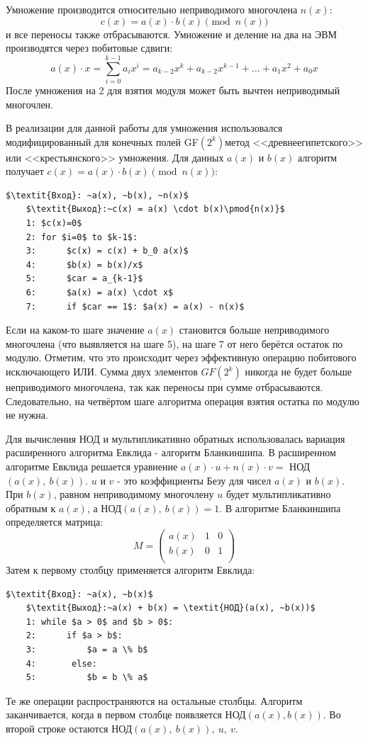 \documentclass[times,specification,annotation]{itmo-student-thesis}
\begin{document}
Умножение производится относительно неприводимого многочлена $n(x)$:
\[c(x) = a(x) \cdot b(x)\pmod{n(x)}\]
и все переносы также отбрасываются.
Умножение и деление на два  на ЭВМ производятся через побитовые сдвиги:
\[a(x) \cdot x = \sum_{i=0}^{k-1}a_i x^i = a_{k-2}x^{k} + a_{k-2}x^{k-1} + \dots + a_1 x^2 + a_0 x\]
После умножения на 2 для взятия модуля может быть вычтен неприводимый многочлен.

В реализации для данной работы для умножения использовался модифицированный для конечных полей GF$(2^k)$метод
<<древнеегипетского>> или <<крестьянского>> умножения.
Для данных $a(x)$ и $b(x)$ алгоритм получает $c(x) = a(x) \cdot b(x) \pmod{n(x)}$:
\begin{lstlisting}[mathescape=true]
    $\textit{Вход}: ~a(x), ~b(x), ~n(x)$
    $\textit{Выход}:~c(x) = a(x) \cdot b(x)\pmod{n(x)}$
    1: $c(x)=0$
    2: for $i=0$ to $k-1$:
    3:      $c(x) = c(x) + b_0 a(x)$
    4:      $b(x) = b(x)/x$
    5:      $car = a_{k-1}$
    6:      $a(x) = a(x) \cdot x$
    7:      if $car == 1$: $a(x) = a(x) - n(x)$
\end{lstlisting}
Если на каком-то шаге значение $a(x)$ становится больше неприводимого многочлена (что выявляется на шаге 5), на шаге 7
от него берётся остаток по модулю.
Отметим, что это происходит через эффективную операцию побитового исключающего ИЛИ.
Сумма двух элементов $GF(2^k)$ никогда не будет больше неприводимого многочлена, так как переносы при сумме отбрасываются.
Следовательно, на четвёртом шаге алгоритма операция взятия остатка по модулю не нужна.

Для вычисления НОД и мультипликативно обратных использовалась вариация расширенного алгоритма Евклида
- алгоритм Бланкиншипа.
В расширенном алгоритме Евклида решается уравнение $a(x) \cdot u + n(x) \cdot v =$ НОД$(a(x), ~b(x))$.
$u$ и $v$ - это коэффициенты Безу для чисел $a(x)$ и $b(x)$.
При $b(x)$, равном неприводимому многочлену $u$ будет мультипликативно обратным к $a(x)$, а НОД$(a(x), ~b(x)) = 1$.
В алгоритме Бланкиншипа определяется матрица:
\begin{equation*}
M =
\begin{pmatrix}
a(x) & 1 & 0 \\
b(x) & 0 & 1\\
\end{pmatrix}
\end{equation*}
Затем к первому столбцу применяется алгоритм Евклида:
\begin{lstlisting}[mathescape=true]
    $\textit{Вход}: ~a(x), ~b(x)$
    $\textit{Выход}:~a(x) + b(x) = \textit{НОД}(a(x), ~b(x))$
    1: while $a > 0$ and $b > 0$:
    2:      if $a > b$:
    3:          $a = a \% b$
    4:       else:
    5:          $b = b \% a$
\end{lstlisting}
Те же операции распространяются на остальные столбцы.
Алгоритм заканчивается, когда в первом столбце появляется НОД$(a(x), b(x))$.
Во второй строке остаются НОД$(a(x), ~b(x)), ~u, ~v$.
\end{document}
